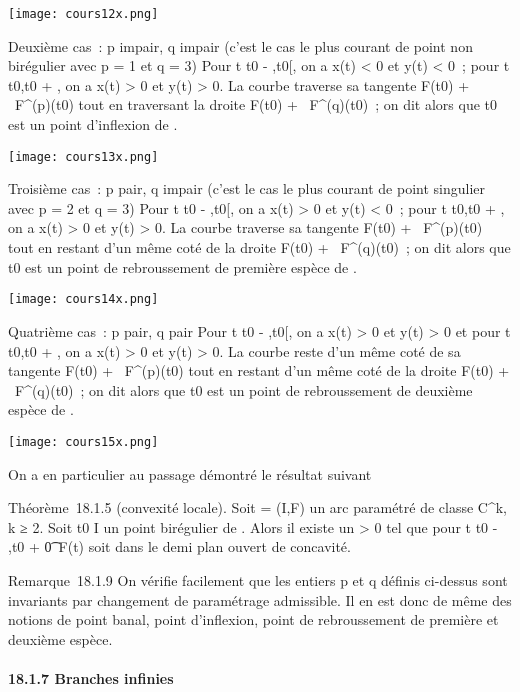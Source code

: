 \text\texttt{[image: cours12x.png]}

Deuxième cas~: p impair, q impair (c'est le cas le plus courant de point
non birégulier avec p = 1 et q = 3) Pour t \in{]}t0 -
\eta,t0{[}, on a x(t) \textless{} 0 et y(t) \textless{} 0~; pour
t \in{]}t0,t0 + \eta{[}, on a x(t) \textgreater{} 0 et
y(t) \textgreater{} 0. La courbe traverse sa tangente F(t0) +
~F^(p)(t0) tout en traversant la droite
F(t0) + ~F^(q)(t0)~; on dit alors que
t0 est un point d'inflexion de \Gamma.

\text\texttt{[image: cours13x.png]}

Troisième cas~: p pair, q impair (c'est le cas le plus courant de point
singulier avec p = 2 et q = 3) Pour t \in{]}t0 -
\eta,t0{[}, on a x(t) \textgreater{} 0 et y(t) \textless{} 0~;
pour t \in{]}t0,t0 + \eta{[}, on a x(t) \textgreater{} 0
et y(t) \textgreater{} 0. La courbe traverse sa tangente F(t0)
+ ~F^(p)(t0) tout en restant d'un même coté de la
droite F(t0) + ~F^(q)(t0)~; on dit alors
que t0 est un point de rebroussement de première espèce de \Gamma.

\text\texttt{[image: cours14x.png]}

Quatrième cas~: p pair, q pair Pour t \in{]}t0 -
\eta,t0{[}, on a x(t) \textgreater{} 0 et y(t) \textgreater{} 0
et pour t \in{]}t0,t0 + \eta{[}, on a x(t) \textgreater{}
0 et y(t) \textgreater{} 0. La courbe reste d'un même coté de sa
tangente F(t0) + ~F^(p)(t0) tout en
restant d'un même coté de la droite F(t0) +
~F^(q)(t0)~; on dit alors que t0 est un
point de rebroussement de deuxième espèce de \Gamma.

\text\texttt{[image: cours15x.png]}

On a en particulier au passage démontré le résultat suivant

Théorème~18.1.5 (convexité locale). Soit \Gamma = (I,F) un arc paramétré de
classe C^k, k ≥ 2. Soit t0 \in I un point birégulier
de \Gamma. Alors il existe un \eta \textgreater{} 0 tel que pour t
\in{]}t0 - \eta,t0 +
\eta{[}\diagdown\t0\, F(t) soit dans le
demi plan ouvert de concavité.

Remarque~18.1.9 On vérifie facilement que les entiers p et q définis
ci-dessus sont invariants par changement de paramétrage admissible. Il
en est donc de même des notions de point banal, point d'inflexion, point
de rebroussement de première et deuxième espèce.

\paragraph{18.1.7 Branches infinies}

